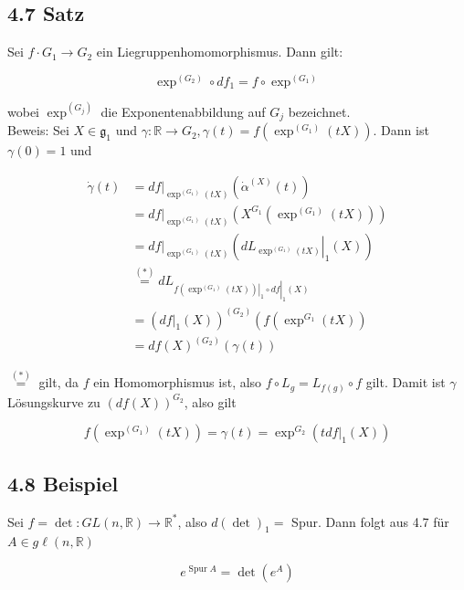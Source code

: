 \documentclass[10pt, letterpaper]{article}
\begin{document}
\subsection*{4.7 Satz}
Sei $f \cdot G_{1} \rightarrow G_{2}$ ein Liegruppenhomomorphismus. Dann gilt:

$$
\exp ^{\left(G_{2}\right)} \circ d f_{1}=f \circ \exp ^{\left(G_{1}\right)}
$$

wobei $\exp ^{\left(G_{j}\right)}$ die Exponentenabbildung auf $G_{j}$ bezeichnet.\\
Beweis: Sei $X \in \mathfrak{g}_{1}$ und $\gamma: \mathbb{R} \rightarrow G_{2}, \gamma(t)=f\left(\exp ^{\left(G_{1}\right)}(t X)\right)$. Dann ist $\gamma(0)=1$ und

$$
\begin{aligned}
\dot{\gamma}(t) & =\left.d f\right|_{\exp ^{\left(G_{1}\right)}(t X)}\left(\dot{\alpha}^{(X)}(t)\right) \\
& =\left.d f\right|_{\exp ^{\left(G_{1}\right)}(t X)}\left(X^{G_{1}}\left(\exp ^{\left(G_{1}\right)}(t X)\right)\right) \\
& =\left.d f\right|_{\exp ^{\left(G_{1}\right)}(t X)}\left(\left.d L_{\exp ^{\left(G_{1}\right)}(t X)}\right|_{1}(X)\right) \\
& \stackrel{(*)}{=} d L_{\left.\left.f\left(\exp ^{\left(G_{1}\right)}(t X)\right)\right|_{1} \circ d f\right|_{1}(X)} \\
& =\left(\left.d f\right|_{1}(X)\right)^{\left(G_{2}\right)}\left(f\left(\exp ^{G_{1}}(t X)\right)\right. \\
& =d f(X)^{\left(G_{2}\right)}(\gamma(t))
\end{aligned}
$$

$\stackrel{(*)}{=}$ gilt, da $f$ ein Homomorphismus ist, also $f \circ L_{g}=L_{f(g)} \circ f$ gilt. Damit ist $\gamma$ Lösungskurve zu $(d f(X))^{G_{2}}$, also gilt

$$
f\left(\exp ^{\left(G_{1}\right)}(t X)\right)=\gamma(t)=\exp ^{G_{2}}\left(\left.t d f\right|_{1}(X)\right)
$$

\subsection*{4.8 Beispiel}
Sei $f=\operatorname{det}: G L(n, \mathbb{R}) \rightarrow \mathbb{R}^{*}$, also $d(\operatorname{det})_{1}=$ Spur. Dann folgt aus 4.7 für $A \in g \ell(n, \mathbb{R})$

$$
e^{\operatorname{Spur} A}=\operatorname{det}\left(e^{A}\right)
$$
\end{document}
